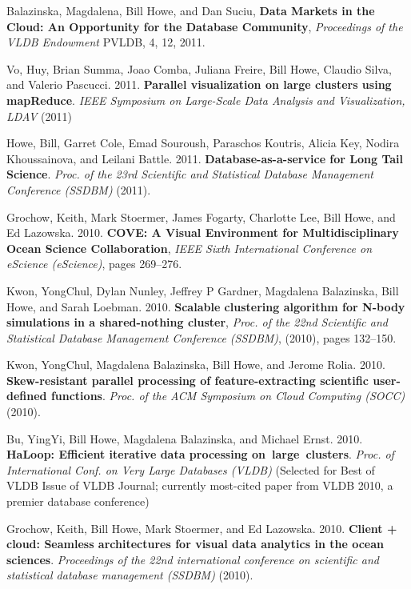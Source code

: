 \begin{bulletlist}
\item Balazinska, Magdalena, Bill Howe, and Dan Suciu,
\textbf{Data Markets in the Cloud: An Opportunity for the Database Community},
\emph{Proceedings of the VLDB Endowment} PVLDB, 4, 12, 2011. 

\item Vo, Huy, Brian Summa, Joao Comba, Juliana Freire, Bill Howe, Claudio Silva, and Valerio
Pascucci. 2011. \textbf{Parallel visualization on large clusters using
mapReduce}. \emph{{IEEE} Symposium on Large-Scale Data Analysis and Visualization, {LDAV}}
(2011)

\item Howe, Bill, Garret Cole, Emad Souroush, Paraschos Koutris, Alicia Key, Nodira
Khoussainova, and Leilani Battle. 2011. \textbf{Database-as-a-service for Long
Tail Science}. \emph{Proc. of the 23rd Scientific and Statistical
Database Management Conference (SSDBM)} (2011). 

\item Grochow, Keith, Mark Stoermer, James Fogarty, Charlotte Lee, Bill Howe, and Ed Lazowska. 2010. \textbf{COVE: A Visual Environment for Multidisciplinary Ocean Science Collaboration},
\emph{IEEE Sixth International Conference on eScience (eScience)}, pages 269--276.

\item Kwon, YongChul, Dylan Nunley, Jeffrey P Gardner, Magdalena Balazinska, Bill Howe, and Sarah Loebman. 2010. \textbf{Scalable clustering algorithm for N-body simulations in a shared-nothing cluster}, \emph{Proc. of the 22nd Scientific and Statistical
Database Management Conference (SSDBM)}, (2010), pages 132--150.

\item Kwon, YongChul, Magdalena Balazinska, Bill Howe, and Jerome Rolia.
2010. \textbf{Skew-resistant parallel processing of feature-extracting
scientific user-defined functions}. \emph{Proc. of the ACM Symposium on
Cloud Computing (SOCC)} (2010). 

\item Bu, YingYi, Bill Howe, Magdalena Balazinska, and Michael Ernst. 2010.
\textbf{HaLoop: Efficient iterative data processing on~large~clusters}.
\emph{Proc. of International Conf. on Very Large Databases (VLDB)} (Selected for Best of VLDB Issue of VLDB Journal; currently most-cited paper from VLDB 2010, a premier database conference)

\item Grochow, Keith, Bill Howe, Mark Stoermer, and Ed Lazowska. 2010. 
\textbf{Client + cloud: Seamless
architectures for visual data analytics in the ocean sciences}.
\emph{Proceedings of the 22nd international conference on scientific and
statistical database management (SSDBM)} (2010). 


\end{bulletlist}
